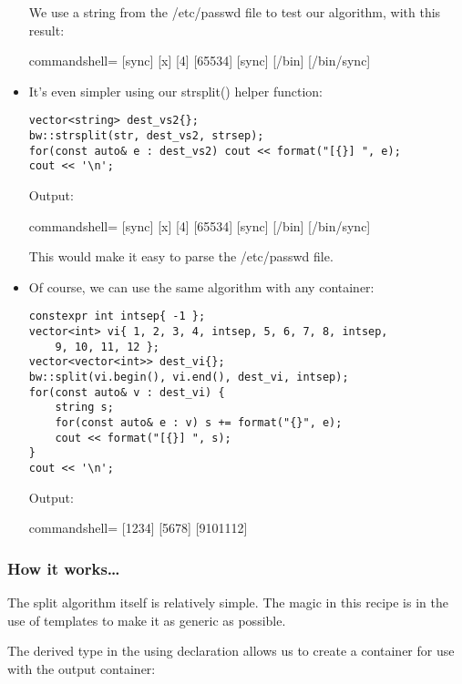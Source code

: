 \begin{itemize}
We use a string from the /etc/passwd file to test our algorithm, with this result:

\begin{tcblisting}{commandshell={}}
[sync] [x] [4] [65534] [sync] [/bin] [/bin/sync]
\end{tcblisting}

\item 
It's even simpler using our strsplit() helper function:

\begin{lstlisting}[style=styleCXX]
vector<string> dest_vs2{};
bw::strsplit(str, dest_vs2, strsep);
for(const auto& e : dest_vs2) cout << format("[{}] ", e);
cout << '\n';
\end{lstlisting}

Output:

\begin{tcblisting}{commandshell={}}
[sync] [x] [4] [65534] [sync] [/bin] [/bin/sync]
\end{tcblisting}

This would make it easy to parse the /etc/passwd file.

\item 
Of course, we can use the same algorithm with any container:

\begin{lstlisting}[style=styleCXX]
constexpr int intsep{ -1 };
vector<int> vi{ 1, 2, 3, 4, intsep, 5, 6, 7, 8, intsep,
	9, 10, 11, 12 };
vector<vector<int>> dest_vi{};
bw::split(vi.begin(), vi.end(), dest_vi, intsep);
for(const auto& v : dest_vi) {
	string s;
	for(const auto& e : v) s += format("{}", e);
	cout << format("[{}] ", s);
}
cout << '\n';
\end{lstlisting}

Output:

\begin{tcblisting}{commandshell={}}
[1234] [5678] [9101112]
\end{tcblisting}
\end{itemize}

\subsubsection{How it works…}

The split algorithm itself is relatively simple. The magic in this recipe is in the use of templates to make it as generic as possible.

The derived type in the using declaration allows us to create a container for use with the output container:

